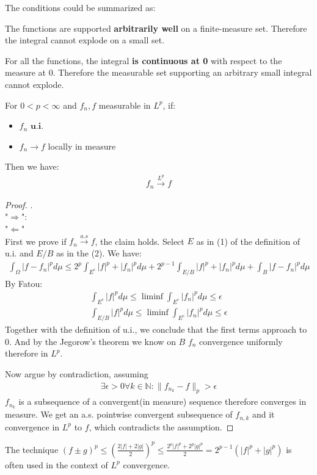 The conditions could be summarized as:\par 
The functions are supported \textbf{arbitrarily well} on a finite-measure set. Therefore the integral cannot explode on a small set.\par 
For all the functions, the integral \textbf{is continuous at 0} with respect to the measure at 0. Therefore the measurable set supporting an arbitrary small integral cannot explode.

\begin{theorem}
	For $0< p < \infty$ and $f_n, f$ measurable in $L^p$, if:
	\begin{itemize}
		\item $f_n \textbf{  u.i.}$
		\item $f_n \rightarrow f$ locally in measure
	\end{itemize}
	Then we have:
	\begin{align*}
		f_n \overset{L^p}{\longrightarrow} f 
	\end{align*}
\end{theorem}
\begin{proof}.\\
	"$\Rightarrow$":\\
	"$\Leftarrow$"\\
	First we prove if $f_n \overset{a.s}{\rightarrow} f$, the claim holds. 
	Select $E$ as in (1) of the definition of u.i. and $E \slash B$ as in the (2). We have:
	\begin{align*}
		\int_\Omega |f - f_n|^p d\mu \leq 2^p \int_{E^c} |f|^p + |f_n|^p d\mu 
		+ 2^{p-1} \int_{E \slash B} |f|^p + |f_n|^p d\mu + \int_B |f - f_n|^p d\mu 
	\end{align*}
	By Fatou:
	\begin{align*}
		\int_{E^c} |f|^p d\mu \leq \liminf \int_{E^c} |f_n|^p d\mu \leq \epsilon\\
		\int_{E\slash B} |f|^p d\mu  \leq \liminf \int_{E^c} |f_n|^p d\mu  \leq \epsilon
	\end{align*}
	Together with the definition of u.i., we conclude that the first terms approach to 0. And by the Jegorow's theorem we know on $B$ $f_n$ convergence uniformly therefore in $L^p$.\par 
	Now argue by contradiction, assuming 
	\begin{align*}
		\exists \epsilon >0 \forall k \in \mathbb{N} : \|f_{n_k} - f\|_p > \epsilon
	\end{align*}
	$f_{n_k}$ is a subsequence of a convergent(in measure) sequence therefore converges in measure. We get an a.s. pointwise convergent subsequence of $f_{n,k}$ and it convergence in $L^p$ to $f$, which contradicts the assumption.
\end{proof}
\begin{remark}
The technique $(f \pm g)^p \leq (\frac{2|f| + 2|g|}{2})^p \leq \frac{2^p |f|^p + 2^p|g|^p}{2} = 2^{p-1}(|f|^p + |g|^p)$ is often used in the context of $L^p$ convergence.	
\end{remark}



